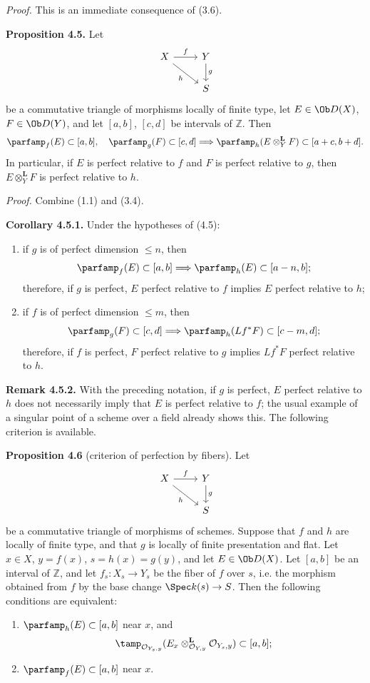 \emph{Proof.} This is an immediate consequence of (3.6).

\textbf{Proposition 4.5.} Let
\[
\begin{tikzcd}
X \arrow[r,"f"] \arrow[dr,"h"'] & Y \arrow[d,"g"]\\
& S
\end{tikzcd}
\]
be a commutative triangle of morphisms locally of finite type, let \(E\in\Ob D(X)\), \(F\in\Ob D(Y)\), and let \([a,b]\), \([c,d]\) be intervals of \(\mathbb Z\). Then
\[
 \parfamp_f(E)\subset[a,b],\quad
 \parfamp_g(F)\subset[c,d]
 \Longrightarrow
 \parfamp_h(E\otimes_Y^{\mathbf L}F)
     \subset[a+c,b+d].
\]
In particular, if \(E\) is perfect relative to \(f\) and \(F\) is perfect relative to \(g\), then \(E\otimes_Y^{\mathbf L}F\) is perfect relative to \(h\).

\emph{Proof.} Combine (1.1) and (3.4).

\textbf{Corollary 4.5.1.} Under the hypotheses of (4.5):
\begin{enumerate}[label=\alph*)]
\item if \(g\) is of perfect dimension \(\leq n\), then
\[
 \parfamp_f(E)
  \subset[a,b]
 \Longrightarrow
 \parfamp_h(E)
  \subset[a-n,b];
\]
therefore, if \(g\) is perfect, \(E\) perfect relative to \(f\) implies \(E\) perfect relative to \(h\);
\item if \(f\) is of perfect dimension \(\leq m\), then
\[
 \parfamp_g(F)
  \subset[c,d]
 \Longrightarrow
 \parfamp_h(Lf^*F)
  \subset[c-m,d];
\]
therefore, if \(f\) is perfect, \(F\) perfect relative to \(g\) implies \(Lf^*F\) perfect relative to \(h\).
\end{enumerate}

\textbf{Remark 4.5.2.} With the preceding notation, if \(g\) is perfect, \(E\) perfect relative to \(h\) does not necessarily imply that \(E\) is perfect relative to \(f\); the usual example of a singular point of a scheme over a field already shows this. The following criterion is available.

\textbf{Proposition 4.6} (criterion of perfection by fibers). Let
\[
\begin{tikzcd}
X \arrow[r,"f"] \arrow[dr,"h"'] & Y \arrow[d,"g"]\\
& S
\end{tikzcd}
\]
be a commutative triangle of morphisms of schemes. Suppose that \(f\) and \(h\) are locally of finite type, and that \(g\) is locally of finite presentation and flat. Let \(x\in X\), \(y=f(x)\), \(s=h(x)=g(y)\), and let \(E\in\Ob D(X)\). Let \([a,b]\) be an interval of \(\mathbb Z\), and let \(f_s:X_s\to Y_s\) be the fiber of \(f\) over \(s\), i.e. the morphism obtained from \(f\) by the base change \(\Spec k(s)\to S\). Then the following conditions are equivalent:
\begin{enumerate}[label=\roman*)]
\item \(\parfamp_h(E)\subset[a,b]\) near \(x\), and
\[
 \tamp_{\mathcal O_{Y_s,y}}(E_x\otimes_{\mathcal O_{Y,y}}^{\mathbf L}\mathcal O_{Y_s,y})
 \subset[a,b];
\]
\item \(\parfamp_f(E)\subset[a,b]\) near \(x\).
\end{enumerate}

